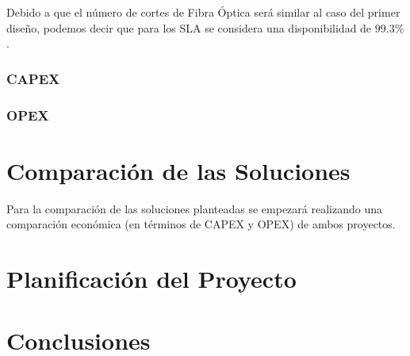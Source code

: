 \documentclass[letterpaper,11pt]{article} %
\begin{document}
\newp
Debido a que el número de cortes de Fibra Óptica será similar al caso del primer diseño, podemos decir que para los SLA se considera una disponibilidad de $99.3\%$.
\subsubsection{CAPEX}

%

\subsubsection{OPEX}


\newpage
\section{Comparación de las Soluciones}

\newp
Para la comparación de las soluciones planteadas se empezará realizando una comparación económica (en términos de CAPEX y OPEX) de ambos proyectos.
\newpage
\section{Planificación del Proyecto}

\newpage
\section{Conclusiones}

\end{document}
